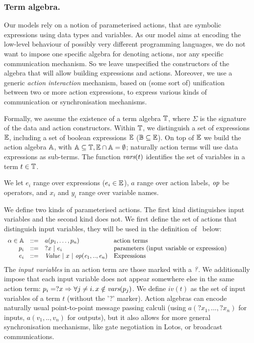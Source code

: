 \documentclass{lmcs}
\newcommand{\TODO}[1]{\textcolor{red}{\textbf{[TODO:#1]}}}
\begin{document}
\subsubsection*{Term algebra.}
Our models rely on a notion of parameterised actions, that are
symbolic expressions using data types and variables. As our model aims
at encoding the low-level behaviour of possibly very different
programming languages, we do not want to impose one specific algebra
for denoting actions, nor any specific communication mechanism. So we
leave unspecified the constructors of the algebra that will allow building
expressions and actions. Moreover, we use a generic {\em action interaction}
mechanism, based on (some sort of) unification between two or more action
expressions, to express various kinds of communication or
synchronisation mechanisms.


Formally, we assume the existence of a term algebra $\mathbb{T}$,
where $\Sigma$ is the signature of the data and action constructors. Within $\mathbb{T}$, we distinguish a set of
 expressions $\mathbb{E}$, including a set of boolean
expressions $\mathbb{E}$ ($\mathbb{B}\subseteq\mathbb{E}$). 
On top of $\mathbb{E}$ we build the action algebra
$\mathbb{A}$, with $\mathbb{A}\subseteq\mathbb{T},
\mathbb{E}\cap\mathbb{A}=\emptyset$;
naturally action terms will use data expressions as sub-terms.
The function
$\vars(t)$ identifies the set of variables in a term
$t\in\mathbb{T}$.

We let $e_i$ range over expressions ($e_i\in\mathbb{E}$), $a$
range over action labels, $\symb{op}$ be operators, and $x_i$ and $y_i$ range over
variable names. 

We define two kinds of parameterised actions. The first kind distinguishes input variables and the second kind does not. 
We first define the set of actions that distinguish input variables, they will be used in the definition of \pLTS\ below:
\[
\begin{array}[l]{rcl@{\quad}p{7.5cm}}
  \alpha\in\AlgA&::=&a(p_1,\ldots,p_n)&\text{action terms}\\
  p_i&::=& ?x~|~e_i&\text{parameters (input variable or expression)}\\
  e_i&::=& \symb{Value}~|~x~|~\symb{op}(\symb{e}_1,..,\symb{e}_n)&\text{Expressions}
\end{array}
\]
The \emph{input variables} in an action term are those marked with a
$\symb{?}$.
We additionally impose that each input variable does not
appear somewhere else in the same action term:
$p_i=?x\Rightarrow\forall j\neq i.\, x\notin \vars(p_j)$.
We define $iv(t)$  as the set of input variables of a term $t$ (without the '?' marker).
Action algebras can encode naturally usual point-to-point message passing calculi (using 
$a(?x_1,...,?x_n)$ for inputs, $a(v_1,..,v_n)$ for outputs), but it also allows
for more general synchronisation mechanisms, like gate negotiation in Lotos, or broadcast
communications. 
\end{document}
